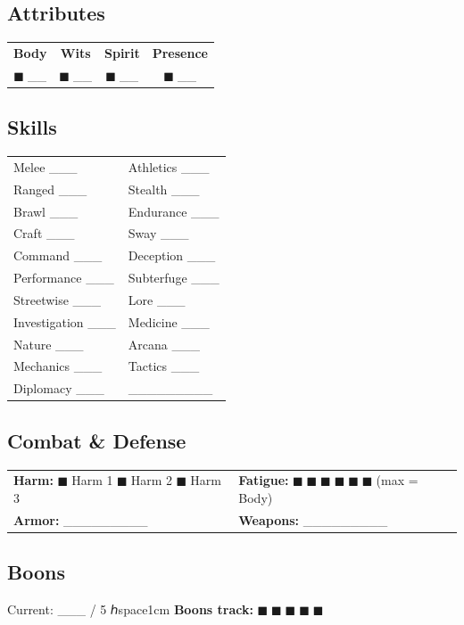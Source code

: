 \documentclass[11pt]{article}
\begin{document}
\subsection*{Attributes}
\begin{center}
\begin{tabular}{cccc}
\textbf{Body} & \textbf{Wits} & \textbf{Spirit} & \textbf{Presence} \\
$■$ __ & $■$ __ & $■$ __ & $■$ __ \\
\end{tabular}
\end{center}

\subsection*{Skills}
\small
\begin{tabularx}{\textwidth}{X X}
Melee ___ & Athletics ___ \\
Ranged ___ & Stealth ___ \\
Brawl ___ & Endurance ___ \\
Craft ___ & Sway ___ \\
Command ___ & Deception ___ \\
Performance ___ & Subterfuge ___ \\
Streetwise ___ & Lore ___ \\
Investigation ___ & Medicine ___ \\
Nature ___ & Arcana ___ \\
Mechanics ___ & Tactics ___ \\
Diplomacy ___ & _________ \\
\end{tabularx}
\normalsize

\vspace{0.3cm}

\subsection*{Combat & Defense}
\begin{tabularx}{\textwidth}{X X}
\textbf{Harm:} $■$ Harm 1  $■$ Harm 2  $■$ Harm 3 &
\textbf{Fatigue:} $■$ $■$ $■$ $■$ $■$ $■$ (max = Body) \\
\textbf{Armor:} _________ & \textbf{Weapons:} _________ \\
\end{tabularx}

\subsection*{Boons}
Current: ___ / 5 ℎspace{1cm} \textbf{Boons track:} $■$ $■$ $■$ $■$ $■$
\end{document}
